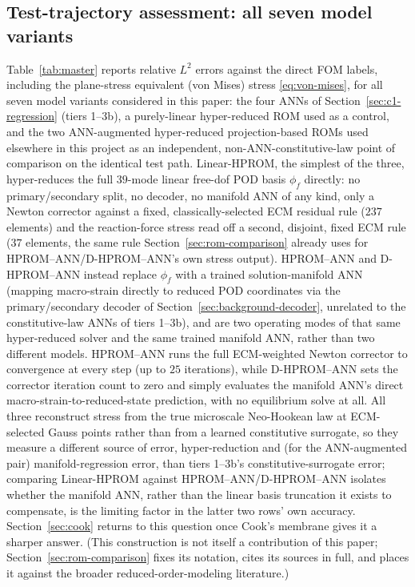 \documentclass[10pt,a4paper]{article}
\begin{document}
\subsection{Test-trajectory assessment: all seven model variants}
\label{sec:results}
Table~\ref{tab:master} reports relative $L^2$ errors against the direct
FOM labels, including the plane-stress equivalent (von Mises) stress
\eqref{eq:von-mises}, for all seven model variants considered in this
paper: the four ANNs of Section~\ref{sec:c1-regression} (tiers
1--3b), a purely-linear hyper-reduced ROM used as a control, and the
two ANN-augmented hyper-reduced projection-based ROMs used elsewhere in
this project as an independent, non-ANN-constitutive-law point of
comparison on the identical test path. Linear-HPROM, the simplest of
the three, hyper-reduces the full $39$-mode linear free-dof POD basis
$\phi_f$ directly: no primary/secondary split, no decoder, no manifold
ANN of any kind, only a Newton corrector against a fixed,
classically-selected ECM residual rule ($237$ elements) and the
reaction-force stress read off a second, disjoint, fixed ECM rule
($37$ elements, the same rule Section~\ref{sec:rom-comparison} already
uses for HPROM--ANN/D-HPROM--ANN's own stress output). HPROM--ANN
and D-HPROM--ANN instead replace $\phi_f$ with a trained
solution-manifold ANN (mapping macro-strain directly to reduced POD
coordinates via the primary/secondary decoder of
Section~\ref{sec:background-decoder}, unrelated to the constitutive-law
ANNs of tiers 1--3b), and are two operating modes of that same
hyper-reduced solver and the same trained manifold ANN, rather than two
different models. HPROM--ANN runs the full ECM-weighted Newton
corrector to convergence at every step (up to $25$ iterations), while
D-HPROM--ANN sets the corrector iteration count to zero and simply
evaluates the manifold ANN's direct macro-strain-to-reduced-state
prediction, with no equilibrium solve at all. All three reconstruct
stress from the true microscale Neo-Hookean law at ECM-selected Gauss
points rather than from a learned constitutive surrogate, so they
measure a different source of error, hyper-reduction and (for the
ANN-augmented pair) manifold-regression error, than tiers 1--3b's
constitutive-surrogate error; comparing Linear-HPROM against
HPROM--ANN/D-HPROM--ANN isolates whether the manifold ANN, rather than
the linear basis truncation it exists to compensate, is the limiting
factor in the latter two rows' own accuracy. Section~\ref{sec:cook}
returns to this question once Cook's membrane gives it a sharper answer.
(This construction is not itself a contribution of this paper;
Section~\ref{sec:rom-comparison} fixes its notation, cites its sources
in full, and places it against the broader reduced-order-modeling
literature.)
\end{document}
